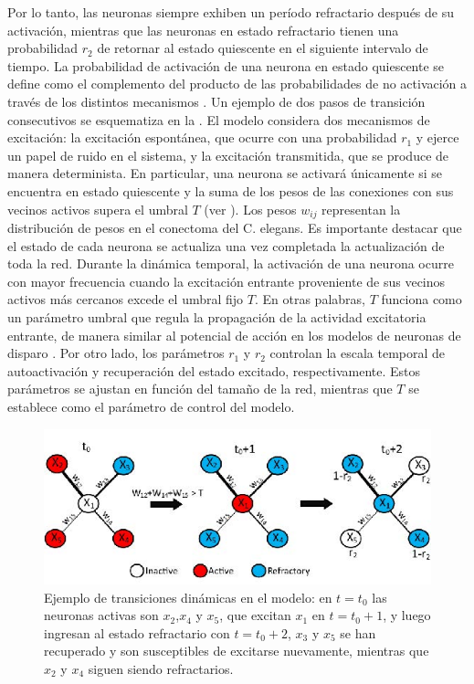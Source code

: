 Por lo tanto,  las neuronas siempre exhiben un período refractario después de su activación, mientras que las neuronas en estado refractario tienen una probabilidad $r_2$ de retornar al estado quiescente en el siguiente intervalo de tiempo. La probabilidad de activación de una neurona en estado quiescente se define como el complemento del producto de las probabilidades de no activación a través de los distintos mecanismos \cite{diaz_similar_2021}. Un ejemplo de dos pasos de transición consecutivos se esquematiza en la . El modelo considera dos mecanismos de excitación: la excitación espontánea, que ocurre con una probabilidad $r_1$ y ejerce un papel de ruido en el sistema, y la excitación transmitida, que se produce de manera determinista.  En particular, una neurona se activará únicamente si se encuentra en estado quiescente y la suma de los pesos de las conexiones con sus vecinos activos supera el umbral $T$ (ver  ). Los pesos $w_{ij}$ representan la distribución de pesos en el conectoma del C. elegans. Es importante destacar que el estado de cada neurona se actualiza una vez completada la actualización de toda la red.  Durante la dinámica temporal, la activación de una neurona ocurre con mayor frecuencia cuando la excitación entrante proveniente de sus vecinos activos más cercanos excede el umbral fijo $T$. En otras palabras, $T$ funciona como un parámetro umbral que regula la propagación de la actividad excitatoria entrante, de manera similar al potencial de acción en los modelos de neuronas de disparo \cite{rocha_homeostatic_2018}. Por otro lado, los parámetros $r_1$ y $r_2$ controlan la escala temporal de autoactivación y recuperación del estado excitado, respectivamente. Estos parámetros se ajustan en función del tamaño de la red, mientras que $T$ se establece como el parámetro de control del modelo.


\begin{figure}[ht]
	\centering\includegraphics[width=\imsize]{modelopasos}
	\caption[Ejemplo de transiciones dinámicas en el modelo.]{Ejemplo de transiciones dinámicas en el modelo: en $t = t_0$ las neuronas activas son $x_2$,$x_4$ y $x_5$, que excitan $x_1$ en $t = t_0 + 1$, y luego ingresan al estado refractario con $t = t_0 + 2$, $x_3$ y $x_5$ se han recuperado y son susceptibles de excitarse nuevamente,
		mientras que $x_2$ y $x_4$ siguen siendo refractarios.} 	\label{fig:modelopasos}
\end{figure}




